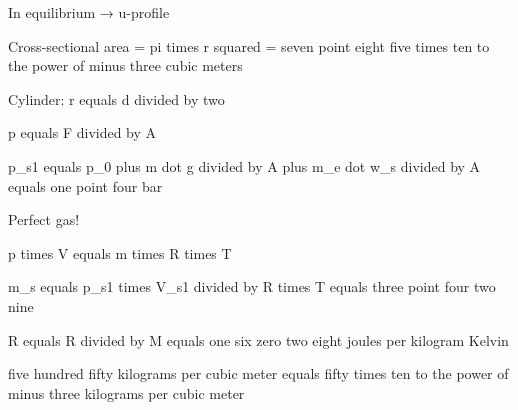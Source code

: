 In equilibrium → u-profile

Cross-sectional area = pi times r squared = seven point eight five times ten to the power of minus three cubic meters

Cylinder: r equals d divided by two

p equals F divided by A

p_s1 equals p_0 plus m dot g divided by A plus m_e dot w_s divided by A equals one point four bar

Perfect gas!

p times V equals m times R times T

m_s equals p_s1 times V_s1 divided by R times T equals three point four two nine

R equals R divided by M equals one six zero two eight joules per kilogram Kelvin 

five hundred fifty kilograms per cubic meter equals fifty times ten to the power of minus three kilograms per cubic meter